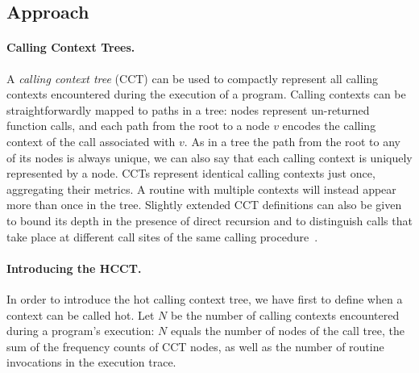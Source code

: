
\subsection{Approach}
\label{ss:hcct-approach}

\paragraph*{Calling Context Trees.} A {\em calling context tree} (CCT) can be used to compactly represent all calling contexts encountered during the execution of a program. Calling contexts can be straightforwardly mapped to paths in a tree: nodes represent un-returned function calls, and each path from the root to a node $v$ encodes the calling context of the call associated with $v$. As in a tree the path from the root to any of its nodes is always unique, we can also say that each calling context is uniquely represented by a node. CCTs represent identical calling contexts just once, aggregating their metrics. A routine with multiple contexts will instead appear more than once in the tree. Slightly extended CCT definitions can also be given to bound its depth in the presence of direct recursion and to distinguish calls that take place at different call sites of the same calling procedure~\cite{Ammons97}.


\paragraph*{Introducing the HCCT.} In order to introduce the hot calling context tree, we have first to define when a context can be called hot. Let $N$ be the number of calling contexts encountered during a program's execution: $N$ equals the number of nodes of the call tree, the sum of the frequency counts of CCT nodes, as well as the number of routine invocations in the execution trace. 

